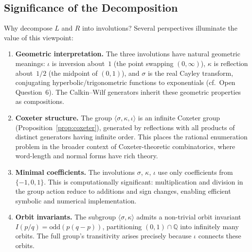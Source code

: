 \documentclass[11pt]{article}
\theoremstyle{plain}
\theoremstyle{definition}
\theoremstyle{remark}
\begin{document}
\subsection*{Significance of the Decomposition}

Why decompose $L$ and $R$ into involutions? Several perspectives illuminate
the value of this viewpoint:

\begin{enumerate}
\item \textbf{Geometric interpretation.} The three involutions have natural
geometric meanings: $\iota$ is inversion about~$1$ (the point swapping
$(0,\infty)$), $\kappa$ is reflection about~$1/2$ (the midpoint of $(0,1)$),
and $\sigma$ is the real Cayley transform, conjugating hyperbolic/trigonometric
functions to exponentials (cf.\ Open Question~6). The Calkin--Wilf generators
inherit these geometric properties as compositions.

\item \textbf{Coxeter structure.} The group $\langle \sigma, \kappa, \iota \rangle$
is an infinite Coxeter group (Proposition~\ref{prop:coxeter}), generated by reflections with all
products of distinct generators having infinite order. This places the rational
enumeration problem in the broader context of Coxeter-theoretic combinatorics,
where word-length and normal forms have rich theory.

\item \textbf{Minimal coefficients.} The involutions $\sigma$, $\kappa$, $\iota$
use only coefficients from $\{-1, 0, 1\}$. This is computationally significant:
multiplication and division in the group action reduce to additions and sign changes,
enabling efficient symbolic and numerical implementation.

\item \textbf{Orbit invariants.} The subgroup $\langle \sigma, \kappa \rangle$
admits a non-trivial orbit invariant $I(p/q) = \mathrm{odd}(p(q-p))$, partitioning
$(0,1) \cap \mathbb{Q}$ into infinitely many orbits. The full group's transitivity
arises precisely because $\iota$ connects these orbits.
\end{enumerate}
\end{document}
